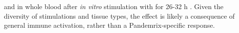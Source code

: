 and in whole blood after \textit{in vitro} stimulation with  for 26-32 h \autocite{manry2017DecipheringGeneticControl}.
%
Given the diversity of stimulations and tissue types, the effect is likely a consequence of general immune activation, rather than a Pandemrix-specific response.


